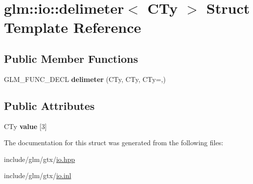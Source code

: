 \hypertarget{structglm_1_1io_1_1delimeter}{}\section{glm\+:\+:io\+:\+:delimeter$<$ C\+Ty $>$ Struct Template Reference}
\label{structglm_1_1io_1_1delimeter}
\subsection*{Public Member Functions}
\begin{DoxyCompactItemize}
\item 
\mbox{\label{structglm_1_1io_1_1delimeter_a5c1db62fae08a4c96eaf336781a4b53d}} 
G\+L\+M\+\_\+\+F\+U\+N\+C\+\_\+\+D\+E\+CL {\bfseries delimeter} (C\+Ty, C\+Ty, C\+Ty=\textquotesingle{},\textquotesingle{})
\end{DoxyCompactItemize}
\subsection*{Public Attributes}
\begin{DoxyCompactItemize}
\item 
\mbox{\label{structglm_1_1io_1_1delimeter_a9ade129dae50c4f716f724e7425f9c68}} 
C\+Ty {\bfseries value} \mbox{[}3\mbox{]}
\end{DoxyCompactItemize}


The documentation for this struct was generated from the following files\+:\begin{DoxyCompactItemize}
\item 
include/glm/gtx/\hyperlink{io_8hpp}{io.\+hpp}\item 
include/glm/gtx/\hyperlink{io_8inl}{io.\+inl}\end{DoxyCompactItemize}
